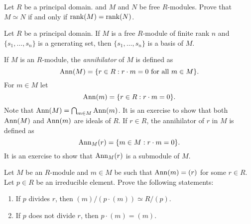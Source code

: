 \begin{exercise}
    Let $R$ be a principal domain. 
    and $M$ and $N$ be free $R$-modules. Prove that 
    $M\simeq N$ if and only if $\operatorname{rank}(M)=\operatorname{rank}(N)$. 	
\end{exercise}

\begin{exercise}
\label{xca:base}
    Let $R$ be a principal domain. 
    If $M$ is a free $R$-module of finite rank $n$ and $\{s_1,\dots,s_n\}$ 
    is a generating set, then $\{s_1,\dots,s_n\}$ is a basis of $M$.
\end{exercise}

If $M$ is an $R$-module, the \emph{annihilator} of $M$ 
is defined as 
\[
\operatorname{Ann}(M)=\{r\in R:r\cdot m=0\text{ for all $m\in M$}\}.
\] 
For $m\in M$ let 
\[
\operatorname{Ann}(m)=\{r\in R:r\cdot m=0\}.
\]  
Note that $\operatorname{Ann}(M)=\bigcap_{m\in M}\operatorname{Ann}(m)$. 
It is an exercise to show that both 
$\operatorname{Ann}(M)$ and $\operatorname{Ann}(m)$ are ideals of $R$. 
If $r\in R$, the annihilator of $r$ in $M$ 
is defined as 
\[
\operatorname{Ann}_M(r)=\{m\in M:r\cdot m=0\}.
\] 
It is an exercise to show that $\operatorname{Ann}_M(r)$ is a submodule of 
$M$. 

\begin{exercise}
Let $M$ be an $R$-module and $m\in M$ be such that $\operatorname{Ann}(m)=(r)$ 
for some $r\in R$. 
Let $p\in R$ be an irreducible element. Prove the following statements: 
\begin{enumerate}
\item If $p$ divides $r$, then $(m)/(p\cdot (m))\simeq R/(p)$.
\item If $p$ does not divide $r$, then $p\cdot (m)=(m)$.
\end{enumerate}
\end{exercise}



